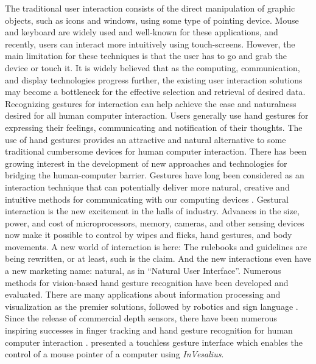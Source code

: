 The traditional user interaction consists of the direct manipulation of graphic objects, such as icons and windows, using some type of pointing device. Mouse and keyboard are widely used and well-known for these applications, and recently, users can interact more intuitively using touch-screens. However, the main limitation for these techniques is that the user has to go and grab the device or touch it.  
It is widely believed that as the computing, communication, and display technologies progress further, the existing user interaction solutions may become a bottleneck for the effective selection and retrieval of desired data. %
Recognizing gestures for interaction can help achieve the ease and naturalness desired for all human computer interaction. Users generally use hand gestures for expressing their feelings, communicating and notification of their thoughts. The use of hand gestures provides an attractive and natural alternative to some traditional cumbersome devices for human computer interaction. 
There has been growing interest in the development of new approaches and technologies for bridging the human-computer barrier. Gestures have long been considered as an interaction technique that can potentially deliver more natural, creative and intuitive methods for communicating with our computing devices \cite{Rautaray2015}. 
Gestural interaction is the new excitement in the halls of industry. Advances in the size, power, and cost of microprocessors, memory, cameras, and other sensing devices now make it possible to control by wipes and flicks, hand gestures, and body movements. A new world of interaction is here: The rulebooks and guidelines are being rewritten, or at least, such is the claim. And the new interactions even have a new marketing name: natural, as in ``Natural User Interface''.
Numerous methods for vision-based hand gesture recognition have been developed and evaluated. There are many applications about information processing \cite{Moyle2002,Lenman2002} and visualization as the premier solutions, followed by robotics and sign language \cite{Swindells2002,Osawa2000}. 
Since the release of commercial depth sensors, there have been numerous inspiring successes in finger tracking and hand gesture recognition for human computer interaction \cite{ZhouRen2011,Kulshreshth2013}. \citet{Ruppert2012a} presented a touchless gesture interface which enables the control of a mouse pointer of a computer using \textit{InVesalius}. 


